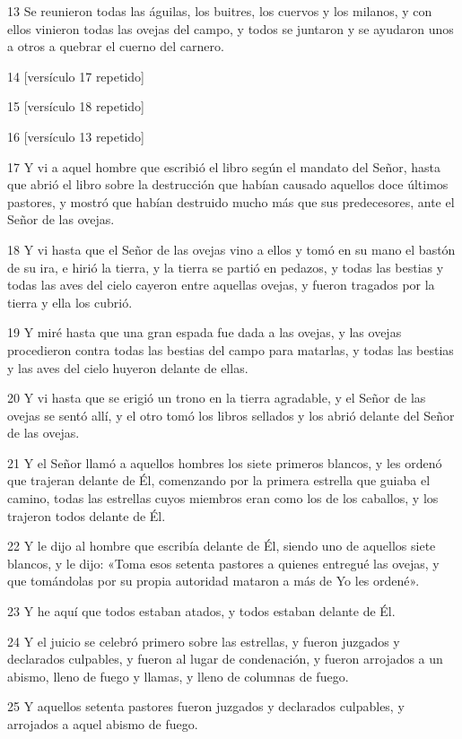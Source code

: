 \par 13 Se reunieron todas las águilas, los buitres, los cuervos y los milanos, y con ellos vinieron todas las ovejas del campo, y todos se juntaron y se ayudaron unos a otros a quebrar el cuerno del carnero.
\par 14 [versículo 17 repetido]
\par 15 [versículo 18 repetido]
\par 16 [versículo 13 repetido]
\par 17 Y vi a aquel hombre que escribió el libro según el mandato del Señor, hasta que abrió el libro sobre la destrucción que habían causado aquellos doce últimos pastores, y mostró que habían destruido mucho más que sus predecesores, ante el Señor de las ovejas.
\par 18 Y vi hasta que el Señor de las ovejas vino a ellos y tomó en su mano el bastón de su ira, e hirió la tierra, y la tierra se partió en pedazos, y todas las bestias y todas las aves del cielo cayeron entre aquellas ovejas, y fueron tragados por la tierra y ella los cubrió.
\par 19 Y miré hasta que una gran espada fue dada a las ovejas, y las ovejas procedieron contra todas las bestias del campo para matarlas, y todas las bestias y las aves del cielo huyeron delante de ellas.
\par 20 Y vi hasta que se erigió un trono en la tierra agradable, y el Señor de las ovejas se sentó allí, y el otro tomó los libros sellados y los abrió delante del Señor de las ovejas.
\par 21 Y el Señor llamó a aquellos hombres los siete primeros blancos, y les ordenó que trajeran delante de Él, comenzando por la primera estrella que guiaba el camino, todas las estrellas cuyos miembros eran como los de los caballos, y los trajeron todos delante de Él.
\par 22 Y le dijo al hombre que escribía delante de Él, siendo uno de aquellos siete blancos, y le dijo: «Toma esos setenta pastores a quienes entregué las ovejas, y que tomándolas por su propia autoridad mataron a más de Yo les ordené».
\par 23 Y he aquí que todos estaban atados, y todos estaban delante de Él.
\par 24 Y el juicio se celebró primero sobre las estrellas, y fueron juzgados y declarados culpables, y fueron al lugar de condenación, y fueron arrojados a un abismo, lleno de fuego y llamas, y lleno de columnas de fuego.
\par 25 Y aquellos setenta pastores fueron juzgados y declarados culpables, y arrojados a aquel abismo de fuego.
